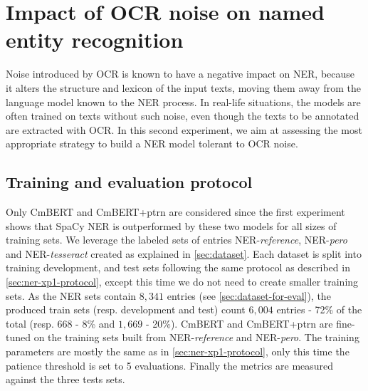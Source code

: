\section{Impact of OCR noise on named entity recognition}
\label{sec:ner-xp2}
Noise introduced by OCR is known to have a negative impact on NER, because it alters the structure and lexicon of the input texts, moving them away from the language model known to the NER process.
In real-life situations, the models are often trained on texts without such noise, even though the texts to be annotated are extracted with OCR.
In this second experiment, we aim at assessing the most appropriate strategy to build a NER model tolerant to OCR noise.


\subsection{Training and evaluation protocol}
Only CmBERT and CmBERT+ptrn are considered since the first experiment shows that SpaCy NER is outperformed by these two models for all sizes of training sets.
We leverage the labeled sets of entries NER-\emph{reference}, NER-\emph{pero} and NER-\emph{tesseract} created as explained in \cref{sec:dataset}.
Each dataset is split into training development, and test sets following the same protocol as described in \cref{sec:ner-xp1-protocol}, except this time we do not need to create smaller training sets.
As the NER sets contain $8,341$ entries (see \cref{sec:dataset-for-eval}), the produced train sets (resp. development and test) count $6,004$ entries - 72\% of the total (resp. 668 - 8\% and $1,669$ - 20\%).
CmBERT and CmBERT+ptrn are fine-tuned on the training sets built from NER-\emph{reference} and NER-\emph{pero}.
The training parameters are mostly the same as in \cref{sec:ner-xp1-protocol}, only this time the patience threshold is set to 5 evaluations.
Finally the metrics are measured against the three tests sets.






